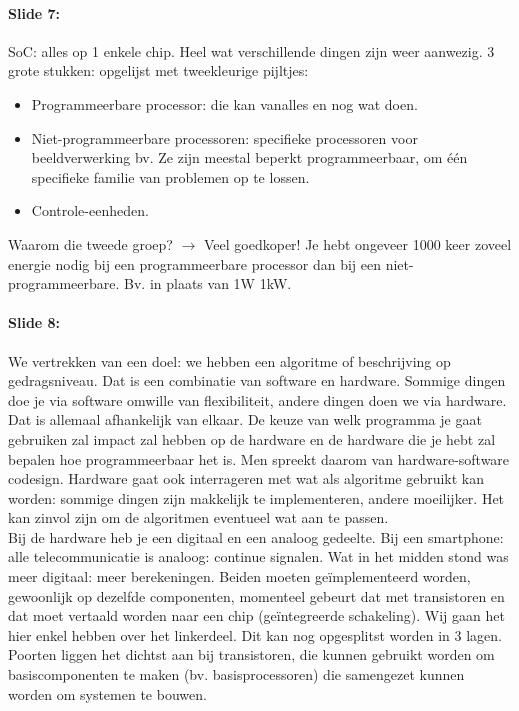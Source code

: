 \documentclass[10pt,a4paper]{book}
\begin{document}
\paragraph{Slide 7:} SoC: alles op 1 enkele chip. Heel wat verschillende dingen zijn weer aanwezig. 3 grote stukken: opgelijst met tweekleurige pijltjes:
\begin{itemize}
\item Programmeerbare processor: die kan vanalles en nog wat doen.
\item Niet-programmeerbare processoren: specifieke processoren voor beeldverwerking bv. Ze zijn meestal beperkt programmeerbaar, om \'e\'en specifieke familie van problemen op te lossen.
\item Controle-eenheden.
\end{itemize}
Waarom die tweede groep? $\rightarrow$ Veel goedkoper! Je hebt ongeveer 1000 keer zoveel energie nodig bij een programmeerbare processor dan bij een niet-programmeerbare. Bv. in plaats van 1W 1kW.

\paragraph{Slide 8:} We vertrekken van een doel: we hebben een algoritme of beschrijving op gedragsniveau. Dat is een combinatie van software en hardware. Sommige dingen doe je via software omwille van flexibiliteit, andere dingen doen we via hardware. Dat is allemaal afhankelijk van elkaar. De keuze van welk programma je gaat gebruiken zal impact zal hebben op de hardware en de hardware die je hebt zal bepalen hoe programmeerbaar het is. Men spreekt daarom van hardware-software codesign. Hardware gaat ook interrageren met wat als algoritme gebruikt kan worden: sommige dingen zijn makkelijk te implementeren, andere moeilijker. Het kan zinvol zijn om de algoritmen eventueel wat aan te passen. \\
Bij de hardware heb je een digitaal en een analoog gedeelte. Bij een smartphone: alle telecommunicatie is analoog: continue signalen. Wat in het midden stond was meer digitaal: meer berekeningen. Beiden moeten ge\"implementeerd worden, gewoonlijk op dezelfde componenten, momenteel gebeurt dat met transistoren en dat moet vertaald worden naar een chip (ge\"integreerde schakeling). Wij gaan het hier enkel hebben over het linkerdeel. Dit kan nog opgesplitst worden in 3 lagen. Poorten liggen het dichtst aan bij transistoren, die kunnen gebruikt worden om basiscomponenten te maken (bv. basisprocessoren) die samengezet kunnen worden om systemen te bouwen.
\end{document}
